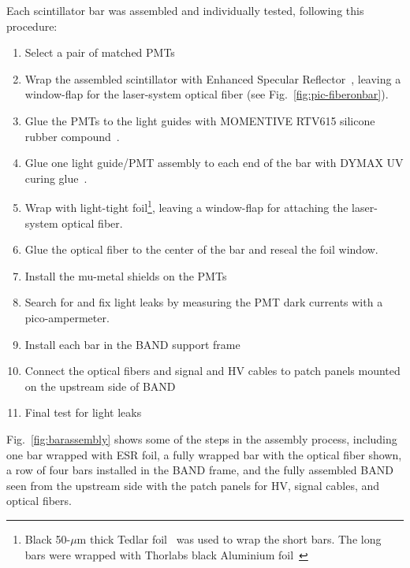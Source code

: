 \documentclass[3p,twocolumn]{elsarticle}
\begin{document}
Each scintillator bar was assembled and individually tested, following this procedure:
\begin{enumerate}
\item Select a pair of matched PMTs
\item Wrap the assembled scintillator with Enhanced Specular Reflector~\cite{3MESR}, leaving a window-flap for the laser-system optical fiber (see Fig.~\ref{fig:pic-fiberonbar}).
\item Glue the PMTs to the light guides with MOMENTIVE RTV615 silicone rubber compound~\cite{softglue}.
\item Glue one light guide/PMT assembly to each end of the bar with DYMAX
  UV curing glue~\cite{uvglue}.
\item Wrap with light-tight foil\footnote{Black 50-$\mu$m thick Tedlar\textregistered{} foil~\cite{tedlarfoil} 
was used to wrap the short bars. The long bars were wrapped with Thorlabs black Aluminium foil~\cite{thorlabsfoil}}, leaving a
  window-flap for attaching the laser-system optical fiber.
\item Glue the optical fiber to the center of the bar and reseal the foil window.
\item Install the mu-metal shields on the PMTs 
\item Search for and fix light leaks by measuring the PMT dark currents with a pico-ampermeter.
\item Install each bar in the BAND support frame
\item Connect the optical fibers and signal and HV cables to patch panels mounted on the upstream side of BAND
\item Final test for light leaks
\end{enumerate}
Fig.~\ref{fig:barassembly} shows some of the steps in the assembly process,
including one bar wrapped with ESR foil, a fully wrapped bar with the
optical fiber shown, a row of four bars installed in the BAND frame,
and the fully assembled BAND seen from the upstream side with the
patch panels for HV, signal cables, and optical fibers.
\end{document}
